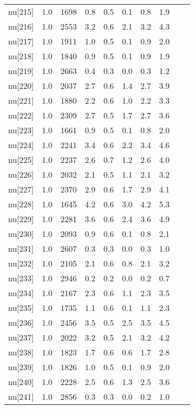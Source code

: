 \begin{longtable}{lrrrrrrr p{} | p{} |}
  nu[215] & 1.0 & 1698 & 0.8 & 0.5 & 0.1 & 0.8 & 1.9 \\ 
  nu[216] & 1.0 & 2553 & 3.2 & 0.6 & 2.1 & 3.2 & 4.3 \\ 
  nu[217] & 1.0 & 1911 & 1.0 & 0.5 & 0.1 & 0.9 & 2.0 \\ 
  nu[218] & 1.0 & 1840 & 0.9 & 0.5 & 0.1 & 0.9 & 1.9 \\ 
  nu[219] & 1.0 & 2663 & 0.4 & 0.3 & 0.0 & 0.3 & 1.2 \\ 
  nu[220] & 1.0 & 2037 & 2.7 & 0.6 & 1.4 & 2.7 & 3.9 \\ 
  nu[221] & 1.0 & 1880 & 2.2 & 0.6 & 1.0 & 2.2 & 3.3 \\ 
  nu[222] & 1.0 & 2309 & 2.7 & 0.5 & 1.7 & 2.7 & 3.6 \\ 
  nu[223] & 1.0 & 1661 & 0.9 & 0.5 & 0.1 & 0.8 & 2.0 \\ 
  nu[224] & 1.0 & 2241 & 3.4 & 0.6 & 2.2 & 3.4 & 4.6 \\ 
  nu[225] & 1.0 & 2237 & 2.6 & 0.7 & 1.2 & 2.6 & 4.0 \\ 
  nu[226] & 1.0 & 2032 & 2.1 & 0.5 & 1.1 & 2.1 & 3.2 \\ 
  nu[227] & 1.0 & 2370 & 2.9 & 0.6 & 1.7 & 2.9 & 4.1 \\ 
  nu[228] & 1.0 & 1645 & 4.2 & 0.6 & 3.0 & 4.2 & 5.3 \\ 
  nu[229] & 1.0 & 2281 & 3.6 & 0.6 & 2.4 & 3.6 & 4.9 \\ 
  nu[230] & 1.0 & 2093 & 0.9 & 0.6 & 0.1 & 0.8 & 2.1 \\ 
  nu[231] & 1.0 & 2607 & 0.3 & 0.3 & 0.0 & 0.3 & 1.0 \\ 
  nu[232] & 1.0 & 2105 & 2.1 & 0.6 & 0.8 & 2.1 & 3.2 \\ 
  nu[233] & 1.0 & 2946 & 0.2 & 0.2 & 0.0 & 0.2 & 0.7 \\ 
  nu[234] & 1.0 & 2167 & 2.3 & 0.6 & 1.1 & 2.3 & 3.5 \\ 
  nu[235] & 1.0 & 1735 & 1.1 & 0.6 & 0.1 & 1.1 & 2.3 \\ 
  nu[236] & 1.0 & 2456 & 3.5 & 0.5 & 2.5 & 3.5 & 4.5 \\ 
  nu[237] & 1.0 & 2022 & 3.2 & 0.5 & 2.1 & 3.2 & 4.2 \\ 
  nu[238] & 1.0 & 1823 & 1.7 & 0.6 & 0.6 & 1.7 & 2.8 \\ 
  nu[239] & 1.0 & 1826 & 1.0 & 0.5 & 0.1 & 0.9 & 2.0 \\ 
  nu[240] & 1.0 & 2228 & 2.5 & 0.6 & 1.3 & 2.5 & 3.6 \\ 
  nu[241] & 1.0 & 2856 & 0.3 & 0.3 & 0.0 & 0.2 & 1.0 \\ 

\end{longtable}
